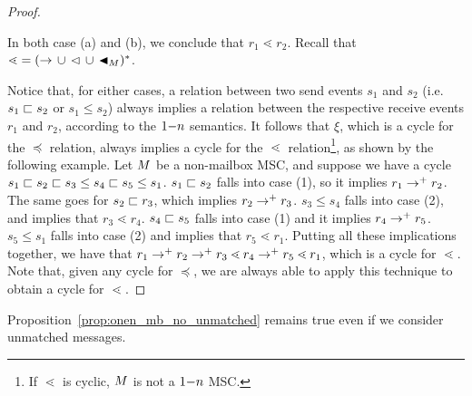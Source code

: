 \documentclass{article}
\begin{document}
\begin{proof}
\begin{enumerate}
\begin{enumerate}
	\end{enumerate}
	In both case (a) and (b), we conclude that $r_1 \lessdot r_2$. Recall that ${\lessdot} = ({\to} \,\cup\, {\lhd} \,\cup\, {\blacktriangleleft_M})^\ast$.
\end{enumerate}
Notice that, for either cases, a relation between two send events $s_1$ and $s_2$ (i.e. $s_1 \sqsubset s_2$ or $s_1 \le s_2$) always implies a relation between the respective receive events $r_1$ and $r_2$, according to the $1\mathsf{-}n$ semantics. It follows that $\xi$, which is a cycle for the $\preceq$ relation, always implies a cycle for the $\lessdot$ relation\footnote{If $\lessdot$ is cyclic, $M$ is not a $1\mathsf{-}n$ MSC.}, as shown by the following example. Let $M$ be a non-mailbox MSC, and suppose we have a cycle $s_1 \sqsubset s_2 \sqsubset s_3 \le s_4 \sqsubset s_5 \le s_1$. $s_1 \sqsubset s_2$ falls into case (1), so it implies $r_1 \to^+ r_2$. The same goes for $s_2 \sqsubset r_3$, which implies $r_2 \to^+ r_3$. $s_3 \le s_4$ falls into case (2), and implies that $r_3 \lessdot r_4$. $s_4 \sqsubset s_5$ falls into case (1) and it implies $r_4 \to^+ r_5$. $s_5 \le s_1$ falls into case (2) and implies that $r_5 \lessdot r_1$. Putting all these implications together, we have that $r_1 \to^+ r_2 \to^+ r_3 \lessdot r_4 \to^+ r_5 \lessdot r_1$, which is a cycle for $\lessdot$. Note that, given any cycle for $\preceq$, we are always able to apply this technique to obtain a cycle for $\lessdot$.
\end{proof}

Proposition~\ref{prop:onen_mb_no_unmatched} remains true even if we consider unmatched messages.
\end{document}
